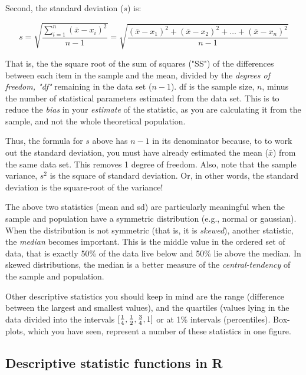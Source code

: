 Second, the standard deviation ($s$) is:

\begin{equation}
	s =  \sqrt{\frac{\sum\limits_{i=1}^n (\bar{x} - x_{i})^2}{n-1}} = 
	\sqrt{\frac{(\bar{x} - x_{1})^{2} + (\bar{x} - x_{2})^2 + \dots + (\bar{x} 
	- x_{n})^{2}}{n-1}}
\end{equation}

That is, the the square root of the sum of squares ("SS") of the 
differences between each item in the sample and the mean, divided by 
the {\it degrees of freedom, "df"} remaining in the data set ($ 
n-1$). df is the sample size, $n$, minus the number of statistical 
parameters estimated from the data set. This is to reduce the {\it 
bias} in your {\it estimate} of the statistic, as you are calculating 
it from the sample, and not the whole theoretical population.

Thus, the formula for $s$ above has $n-1$ in its denominator because, 
to to work out the standard deviation, you must have already estimated 
the mean ($\bar{x}$) from the same data set. This removes 1 degree of 
freedom. Also, note that the sample variance, $s^2$ is the square of 
standard deviation. Or, in other words, the standard deviation is the 
square-root of the variance! 

The above two statistics (mean and sd) are particularly meaningful when 
the sample and population have a symmetric distribution (e.g., normal 
or gaussian). When the distribution is not symmetric (that is, it is 
{\it skewed}), another statistic, the {\it median} becomes important. 
This is the middle value in the ordered set of data, that is exactly 
50\% of the data live below and 50\% lie above the median. In skewed 
distributions, the median is a better measure of the 
{\it central-tendency} of the sample and population. 

Other descriptive statistics you should keep in mind are the range 
(difference between the largest and smallest values), and the quartiles 
(values lying in the data divided into the intervals $[{1\over4}, {1\over 
2},{3\over 4}, 1]$ or at 1\% intervals (percentiles). Box-plots, which 
you have seen, represent a number of these statistics in one figure.   

\subsection{Descriptive statistic functions in R}

